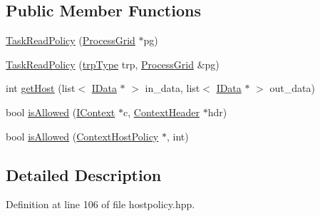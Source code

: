 \subsection*{Public Member Functions}
\begin{DoxyCompactItemize}
\item 
\hyperlink{class_task_read_policy_a7256d073f6b90f4634309d01b51d4270}{TaskReadPolicy} (\hyperlink{class_process_grid}{ProcessGrid} $\ast$pg)
\item 
\hyperlink{class_task_read_policy_a5f0b8a0896b5ef07ef8e5e210fe7dc5b}{TaskReadPolicy} (\hyperlink{class_task_read_policy_a173796d600a0db7f1a29bdc4a35be2bf}{trpType} trp, \hyperlink{class_process_grid}{ProcessGrid} \&pg)
\item 
int \hyperlink{class_task_read_policy_abdf52c85a0ad32a1ad8f63571c0867cf}{getHost} (list$<$ \hyperlink{class_i_data}{IData} $\ast$ $>$ in\_\-data, list$<$ \hyperlink{class_i_data}{IData} $\ast$ $>$ out\_\-data)
\item 
bool \hyperlink{class_task_read_policy_a10db4c46db394c083c73589cb998e5c3}{isAllowed} (\hyperlink{class_i_context}{IContext} $\ast$c, \hyperlink{class_context_header}{ContextHeader} $\ast$hdr)
\item 
bool \hyperlink{class_task_read_policy_a94a18c877a66a55844d538f47deb171d}{isAllowed} (\hyperlink{class_context_host_policy}{ContextHostPolicy} $\ast$, int)
\end{DoxyCompactItemize}


\subsection{Detailed Description}


Definition at line 106 of file hostpolicy.hpp.

